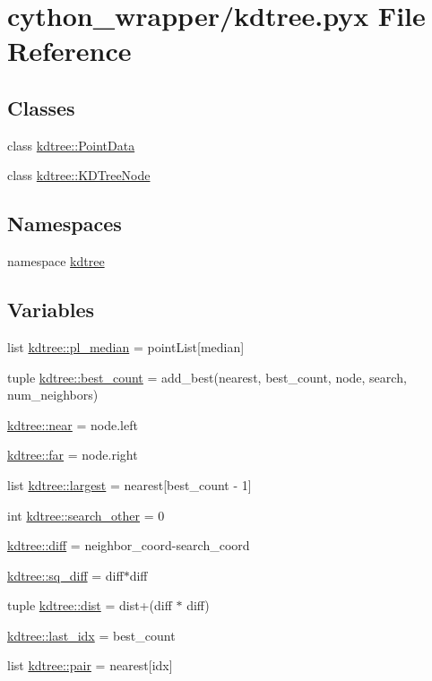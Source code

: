 \hypertarget{cython__wrapper_2kdtree_8pyx}{
\section{cython\_\-wrapper/kdtree.pyx File Reference}
\label{cython__wrapper_2kdtree_8pyx}
}
\subsection*{Classes}
\begin{DoxyCompactItemize}
\item 
class \hyperlink{classkdtree_1_1PointData}{kdtree::PointData}
\item 
class \hyperlink{classkdtree_1_1KDTreeNode}{kdtree::KDTreeNode}
\end{DoxyCompactItemize}
\subsection*{Namespaces}
\begin{DoxyCompactItemize}
\item 
namespace \hyperlink{namespacekdtree}{kdtree}
\end{DoxyCompactItemize}
\subsection*{Variables}
\begin{DoxyCompactItemize}
\item 
list \hyperlink{namespacekdtree_a68dd1b5c2ca51036f48cfb773ef665ac}{kdtree::pl\_\-median} = pointList\mbox{[}median\mbox{]}
\item 
tuple \hyperlink{namespacekdtree_a5254def45bf553b4ed113993acde66ec}{kdtree::best\_\-count} = add\_\-best(nearest, best\_\-count, node, search, num\_\-neighbors)
\item 
\hyperlink{namespacekdtree_a0ba21301aea56f1c2ef165f16bcc6af6}{kdtree::near} = node.left
\item 
\hyperlink{namespacekdtree_a1098829259a7546f7778cfe19c86e50c}{kdtree::far} = node.right
\item 
list \hyperlink{namespacekdtree_a8ae4f604fa3b331f0e1857ef7988dbed}{kdtree::largest} = nearest\mbox{[}best\_\-count -\/ 1\mbox{]}
\item 
int \hyperlink{namespacekdtree_a697ad02b362c4958d0497573757a329a}{kdtree::search\_\-other} = 0
\item 
\hyperlink{namespacekdtree_acdecd5b85843a2d9caa9703f3d246c5a}{kdtree::diff} = neighbor\_\-coord-\/search\_\-coord
\item 
\hyperlink{namespacekdtree_aa6b03574baf9af70ad70c383f1276f53}{kdtree::sq\_\-diff} = diff$\ast$diff
\item 
tuple \hyperlink{namespacekdtree_ab18cecee0f3d4292dc06665f88c9dcd1}{kdtree::dist} = dist+(diff $\ast$ diff)
\item 
\hyperlink{namespacekdtree_a0e2b4f0710247ad4a1bc44217b669f98}{kdtree::last\_\-idx} = best\_\-count
\item 
list \hyperlink{namespacekdtree_a2c9210668756589c874996518e7c43dc}{kdtree::pair} = nearest\mbox{[}idx\mbox{]}
\end{DoxyCompactItemize}
